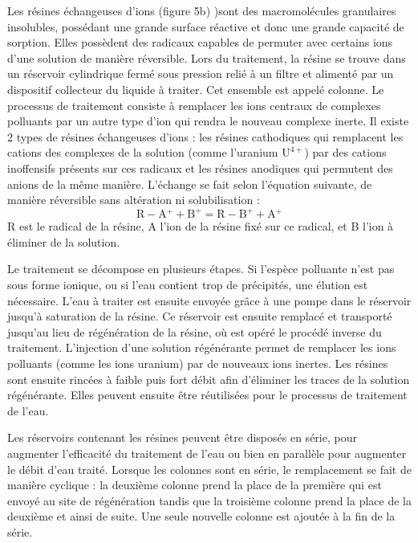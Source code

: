 \documentclass{article}
\begin{document}
Les résines échangeuses d’ions (figure 5b) )sont des macromolécules granulaires insolubles, possédant une grande surface réactive et donc une grande capacité de sorption. Elles possèdent des radicaux capables de permuter avec certains ions d’une solution de manière réversible. Lors du traitement, la résine se trouve dans un réservoir cylindrique fermé sous pression relié à un filtre et alimenté par un dispositif collecteur du liquide à traiter. Cet ensemble est appelé colonne. Le processus de traitement consiste à remplacer les ions centraux de complexes polluants par un autre type d’ion qui rendra le nouveau complexe inerte. Il existe 2 types de résines échangeuses d’ions : les résines cathodiques qui remplacent les cations des complexes de la solution (comme l’uranium $\text{U}^{4+}$) par des cations inoffensifs présents sur ces radicaux et les résines anodiques qui permutent des anions de la même manière. L’échange se fait selon l’équation suivante, de manière réversible sans altération ni solubilisation :
$$\text{R}\!-\!\text{A}\!^+\! + \text{B}^+ = \text{R}\!-\!\text{B}^+\! + \text{A}\!^+$$
R est le radical de la résine, A l’ion de la résine fixé sur ce radical, et B l’ion à éliminer de la solution.

Le traitement se décompose en plusieurs étapes. Si l’espèce polluante n’est pas sous forme ionique, ou si l’eau contient trop de précipités, une élution est nécessaire. L’eau à traiter est ensuite envoyée grâce à une pompe dans le réservoir jusqu’à saturation de la résine. Ce réservoir est ensuite remplacé et transporté jusqu’au lieu de régénération de la résine, où est opéré le procédé inverse du traitement. L’injection d’une solution régénérante permet de remplacer les ions polluants (comme les ions uranium) par de nouveaux ions inertes. Les résines sont ensuite rincées à faible puis fort débit afin d’éliminer les traces de la solution régénérante. Elles peuvent ensuite être réutilisées pour le processus de traitement de l’eau.

Les réservoirs contenant les résines peuvent être disposés en série, pour augmenter l’efficacité du traitement de l’eau ou bien en parallèle pour augmenter le débit d’eau traité. Lorsque les colonnes sont en série, le remplacement se fait de manière cyclique : la deuxième colonne prend la place de la première qui est envoyé au site de régénération tandis que la troisième colonne prend la place de la deuxième et ainsi de suite. Une seule nouvelle colonne est ajoutée à la fin de la série. %
\end{document}
